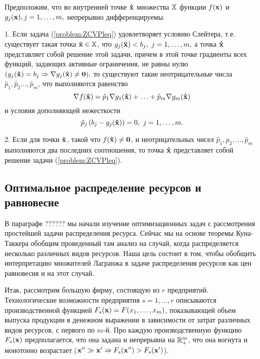 \begin{teop}\label{Kuhn-T-quasi-Vip}
    Предположим, что во внутренней точке $\mathbf{\hat{x}}$ множества
    $\mathbb{X}$ функции $f(\mathbf{x})$ и
    $g_j (\mathbf{x}), j=1,\ldots,m,$ непрерывно дифференцируемы.

    1. Если задача (\ref{problem:ZCVPleq}) удовлетворяет
    условию Слейтера, т.е. существует такая точка
    $\mathbf{\bar{x}}\in\mathbb{X}$, что
    $g_j (\mathbf{\bar{x}})<b_{j}, \  j=1,\ldots,m,$ а
    точка $\mathbf{\hat{x}}$ представляет собой решение этой задачи,
    причем в этой точке градиенты всех функций, задающих активные
    ограничения, не равны нулю
    $(g_{j}(\mathbf{\hat{x}})=b_{j} \Rightarrow \nabla  g_{j}(\mathbf{\hat{x}})\neq\mathbf{0}),$
    то существуют такие неотрицательные числа $\hat p_1, \hat p_2 \ldots, \hat
    p_m$, что выполняются равенство
\[
    \nabla f(\mathbf{\hat{x}})=
    \hat p_1 \nabla g_1(\mathbf{\hat{x}})+ \ldots + \hat p_m \nabla g_m(\mathbf{\hat{x}})
\]
    и условия дополняющей нежесткости
\[
    \hat p_j \,(b_j-g_j(\vc{\hat x}))=0, \ j=1,\ldots,m.
\]

    2. Если для точки $\mathbf{\hat x}$, такой что $f(\mathbf{\hat{x}})\neq\mathbf{0}$, и
    неотрицательных чисел $\hat p_1, \hat p_2, \ldots, \hat p_m$
    выполняются  два последних соотношения, то точка $\mathbf{\hat x}$ представляет
    собой решение задачи (\ref{problem:ZCVPleq}).
\end{teop}


\subsection{Оптимальное распределение ресурсов и равновесие}

    В параграфе ??????
        мы начали изучение оптимизационных задач с рассмотрения
    простейшей задачи распределения ресурса. Сейчас мы на основе
    теоремы Куна-Таккера обобщим проведенный там анализ на случай,
    когда распределяется несколько различных видов ресурсов. Наша
    цель состоит в том, чтобы обобщить интерпретацию множителей Лагранжа
    в задаче распределения ресурсов как цен равновесия и на этот случай.

    Итак, рассмотрим большую фирму, состоящую из $r$ предприятий.
    Технологические возможности предприятия $s=1,\ldots,r$
    описываются производственной функцией
    $F_{s}(\mathbf{x})=F(x_{1},\ldots,x_{m})$,
    показывающей объем выпуска продукции в денежном выражении в
    зависимости от затрат различных видов ресурсов, с
    первого по $m$-й. Про каждую производственную функцию $F_{s}(\mathbf{x})$ предполагается,
    что она задана и непрерывна на $\mathbb{R}^{m}_{+}$, что она вогнута и монотонно
    возрастает ($\mathbf{x''}\gg\mathbf{x'}\Rightarrow
    F_{s}(\mathbf{x''})>F_{s}(\mathbf{x'})$).

